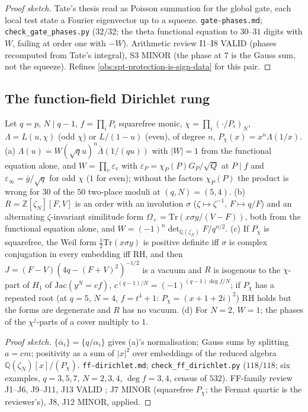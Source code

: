 \begin{proof}[Proof sketch] Tate's thesis read as Poisson summation for the global gate, each local test state a Fourier eigenvector up to a squeeze. \texttt{gate-phases.md};
\texttt{check\_gate\_phases.py} ($32/32$; the theta functional equation to $30$--$31$ digits with $W$, failing at order one with $-W$). Arithmetic review I1--I8 VALID (phases
recomputed from Tate's integral), S3 MINOR (the phase at $7$ is the Gauss sum, not the squeeze). Refines \cref{obs:spt-protection-is-sign-data} for this pair.
\end{proof}

\subsection{The function-field Dirichlet rung}

\begin{proposition}
\label{prop:gkp-ff-dirichlet-rung} 
Let $q = p$, $N\mid q-1$, $f = \prod_iP_i$ squarefree monic, $\chi = \prod_i(\cdot/P_i)_N$, $\Lambda = L(u,\chi)$ (odd $\chi$) or $L/(1-u)$ (even), of degree $n$, $P_\chi(x) = %
x^n\Lambda(1/x)$. (a) $\Lambda(u) = W(\sqrt qu)^n\bar\Lambda(1/(qu))$ with $|W| = 1$ from the functional equation alone, and $W = \prod_v\varepsilon_v$ with $\varepsilon_P = %
\chi_P(P)G_P/\sqrt Q$ at $P\mid f$ and $\varepsilon_\infty = \bar g/\sqrt q$ for odd $\chi$ ($1$ for even); without the factors $\chi_P(P)$ the product is wrong for $30$ of the
$50$ two-place moduli at $(q,N) = (5,4)$. (b) $R = \mathbb Z[\zeta_N][F,V]$ is an order with an involution $\sigma$ ($\zeta\mapsto\zeta^{-1}$, $F\mapsto q/F$) and an alternating %
$\zeta$-invariant similitude form $\Omega_+ = \mathrm{Tr}(x\sigma y/(V-F))$, both from the functional equation alone, and $W = (-1)^n\det_{\mathbb Q(\zeta_N)}F/q^{n/2}$. (c) If %
$P_\chi$ is squarefree, the Weil form $\tfrac12\mathrm{Tr}(x\sigma y)$ is positive definite iff $\sigma$ is complex conjugation in every embedding iff RH, and then $J = %
(F-V)(4q-(F+V)^2)^{-1/2}$ is a vacuum and $R$ is isogenous to the $\chi$-part of $H_1$ of $\mathrm{Jac}(y^N = cf)$, $c^{(q-1)/N} = (-1)^{(q-1)\deg f/N}$; if $P_\chi$ has a
repeated root (at $q = 5$, $N = 4$, $f = t^4+1$: $P_\chi = (x+1+2i)^2$) RH holds but the forms are degenerate and $R$ has no vacuum. (d) For $N = 2$, $W = 1$; the phases of the
$\chi^j$-parts of a cover multiply to $1$.
\end{proposition}
\begin{proof}[Proof sketch] $\{\bar\alpha_i\} = \{q/\alpha_i\}$ gives (a)'s normalisation; Gauss sums by splitting $a = cm$; positivity as a sum of $|x|^2$ over embeddings of the %
reduced algebra $\mathbb Q(\zeta_N)[x]/(P_\chi)$. \texttt{ff-dirichlet.md}; \texttt{check\_ff\_dirichlet.py} ($118/118$; six examples, $q = 3,5,7$, $N = 2,3,4$, $\deg f = 3,4$,
census of $532$). FF-family review J1--J6, J9--J11, J13 VALID ; J7 MINOR (squarefree $P_\chi$; the Fermat quartic is the reviewer's), J8, J12 MINOR, applied.
\end{proof}

